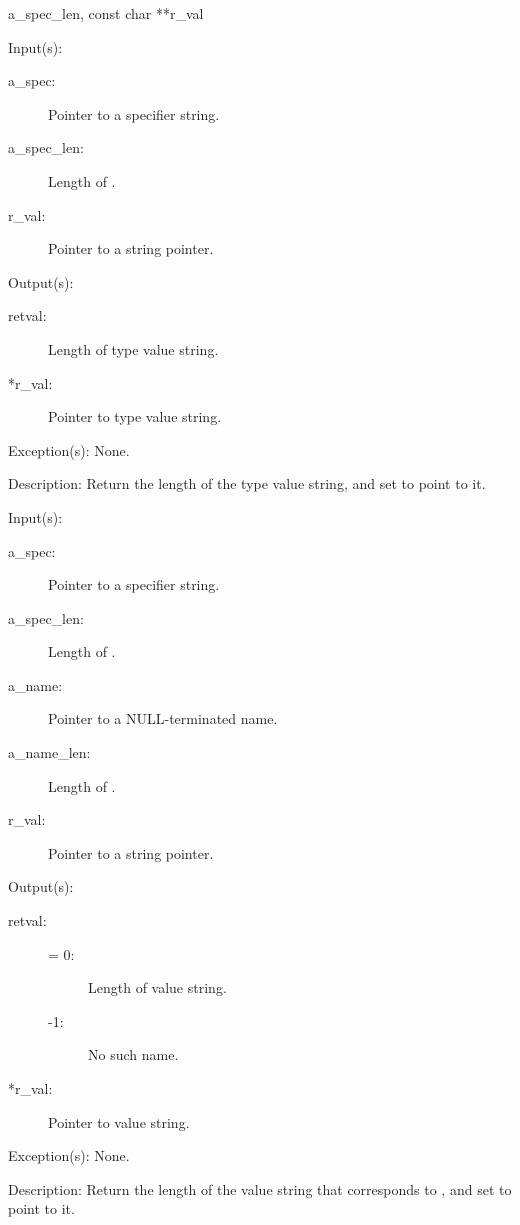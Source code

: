 \begin{capi}
{{a\_spec\_len, const char **r\_val}}
	\begin{capilist}
	\item[Input(s): ]
		\begin{description}\item[]
		\item[a\_spec: ]
			Pointer to a specifier string.
		\item[a\_spec\_len: ]
			Length of .
		\item[r\_val: ]
			Pointer to a string pointer.
		\end{description}
	\item[Output(s): ]
		\begin{description}\item[]
		\item[retval: ]
			Length of type value string.
		\item[*r\_val: ]
			Pointer to type value string.
		\end{description}
	\item[Exception(s): ] None.
	\item[Description: ]
		Return the length of the type value string, and set
		 to point to it.
	\end{capilist}
\label{spec_val_get}
	\begin{capilist}
	\item[Input(s): ]
		\begin{description}\item[]
		\item[a\_spec: ]
			Pointer to a specifier string.
		\item[a\_spec\_len: ]
			Length of \cvar{a\_spec}.
		\item[a\_name: ]
			Pointer to a NULL-terminated name.
		\item[a\_name\_len: ]
			Length of \cvar{a\_name}.
		\item[r\_val: ]
			Pointer to a string pointer.
		\end{description}
	\item[Output(s): ]
		\begin{description}\item[]
		\item[retval: ]
			\begin{description}\item[]
			\item[{\gt}= 0: ]
				Length of value string.
			\item[-1: ]
				No such name.
			\end{description}
		\item[*r\_val: ]
			Pointer to value string.
		\end{description}
	\item[Exception(s): ] None.
	\item[Description: ]
		Return the length of the value string that corresponds to
		, and set  to point to it.
	\end{capilist}
\end{capi}
